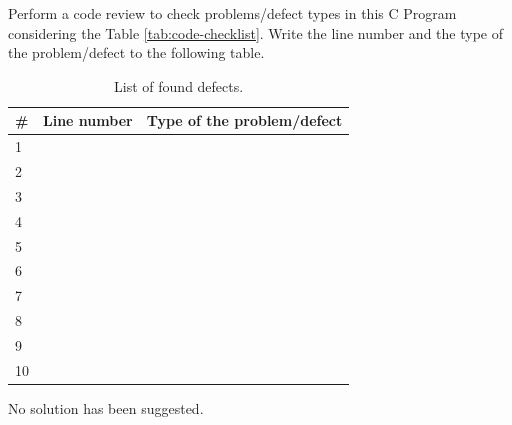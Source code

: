 \begin{exercise}
    Perform a code review to check problems/defect types in this C Program considering the Table \ref{tab:code-checklist}. Write the line number and the type of the problem/defect to the following table.
    
    \begin{table}[H]
    \centering
    \renewcommand{\arraystretch}{1.2}
    \caption{List of found defects.}
    \label{tab:defects-ex}
    \begin{tabular}{p{}|p{}|p{}}
        \toprule
        \# & Line number & Type of the problem/defect\\
        \midrule
        1 & & \\
        \midrule
        2 & & \\
        \midrule
        3 & & \\
        \midrule
        4 & & \\
        \midrule
        5 & & \\
        \midrule
        6 & & \\
        \midrule
        7 & & \\
        \midrule
        8 & & \\
        \midrule
        9 & & \\
        \midrule
        10 & & \\
        \bottomrule
    \end{tabular}
\end{table}
\end{exercise}

\begin{solution}
    No solution has been suggested.
\end{solution}


